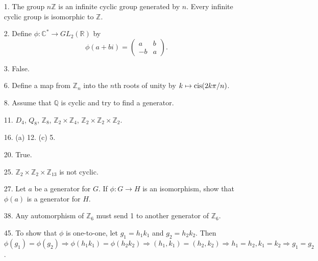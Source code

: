 {\small
\begin{itemize}
 
\item[1.] 
The group $n{\mathbb Z}$ is an infinite cyclic group generated by $n$.
Every infinite cyclic group is isomorphic to ${\mathbb Z}$.
 
 
\item[2.] 
Define $\phi: {\mathbb C}^* \rightarrow GL_2( {\mathbb R})$ by 
\[
\phi(a + bi) = 
\begin{pmatrix}
a & b \\
-b & a
\end{pmatrix}.
\]
 
 
\item[3.]
False.
 
\item[6.]
Define a map from ${\mathbb Z}_n$ into the $n$th roots of unity by $k
\mapsto \operatorname{cis}(2k\pi / n)$.
 
\item[8.]
Assume that ${\mathbb Q}$ is cyclic and try to find a generator.
 
 
\item[11.]
$D_4$, $Q_8$, ${\mathbb Z}_8$, ${\mathbb Z}_2 \times {\mathbb Z}_4$,
${\mathbb Z}_2 \times {\mathbb Z}_2 \times {\mathbb Z}_2$.
 
\item[16.]
(a) 12.
(c) 5.
 
 
\item[20.]
True.
 
 
\item[25.]
${\mathbb Z}_2 \times {\mathbb Z}_2 \times {\mathbb Z}_{13}$ is not cyclic. 
 
\item[27.]
Let $a$ be a generator for $G$. If $\phi :G \rightarrow H$ is an
isomorphism, show that $\phi(a)$ is a generator for $H$.
 
\item[38.]
Any automorphism of ${\mathbb Z}_6$ must send 1 to another generator of
${\mathbb Z}_6$.
 
 
\item[45.]
To show that $\phi$ is one-to-one, let $g_1 = h_1 k_1$ and $g_2 = h_2
k_2$. Then $\phi(g_1) = \phi(g_2) \Rightarrow \phi(h_1 k_1) = \phi(h_2
k_2) \Rightarrow (h_1, k_1) = (h_2, k_2) \Rightarrow h_1 = h_2, k_1 =
k_2 \Rightarrow g_1 = g_2$. 
 
 
 
 
\end{itemize}
}
 
